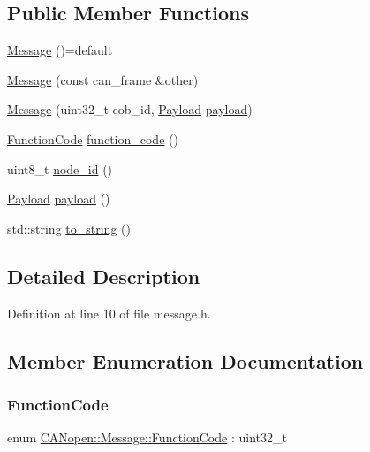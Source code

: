 \subsection*{Public Member Functions}
\begin{DoxyCompactItemize}
\item 
\hyperlink{class_c_a_nopen_1_1_message_a90dac1b216099b2a29f7b4deb3ccced8}{Message} ()=default
\item 
\hyperlink{class_c_a_nopen_1_1_message_a77a8c09ad0711fa4b574a8b88d983441}{Message} (const can\+\_\+frame \&other)
\item 
\hyperlink{class_c_a_nopen_1_1_message_ace3b5218ab769fb1e642b82b2d3fc7d3}{Message} (uint32\+\_\+t cob\+\_\+id, \hyperlink{class_c_a_nopen_1_1_payload}{Payload} \hyperlink{class_c_a_nopen_1_1_message_a65be4f77771803bed521cbbf2316271b}{payload})
\item 
\hyperlink{class_c_a_nopen_1_1_message_a0f8f95e4ea1284011cd122629edc5468}{Function\+Code} \hyperlink{class_c_a_nopen_1_1_message_a83d9901bbd77dcca9b44d68fd1e604b8}{function\+\_\+code} ()
\item 
uint8\+\_\+t \hyperlink{class_c_a_nopen_1_1_message_a845fe0c7682bd6eeef0a5dd87b5e3c63}{node\+\_\+id} ()
\item 
\hyperlink{class_c_a_nopen_1_1_payload}{Payload} \hyperlink{class_c_a_nopen_1_1_message_a65be4f77771803bed521cbbf2316271b}{payload} ()
\item 
std\+::string \hyperlink{class_c_a_nopen_1_1_message_a0d3aade9268f612f1918d64e8c6057b7}{to\+\_\+string} ()
\end{DoxyCompactItemize}


\subsection{Detailed Description}


Definition at line 10 of file message.\+h.



\subsection{Member Enumeration Documentation}
\mbox{\label{class_c_a_nopen_1_1_message_a0f8f95e4ea1284011cd122629edc5468}} 
\subsubsection{\texorpdfstring{Function\+Code}{FunctionCode}}
{\footnotesize\ttfamily enum \hyperlink{class_c_a_nopen_1_1_message_a0f8f95e4ea1284011cd122629edc5468}{C\+A\+Nopen\+::\+Message\+::\+Function\+Code} \+: uint32\+\_\+t}

